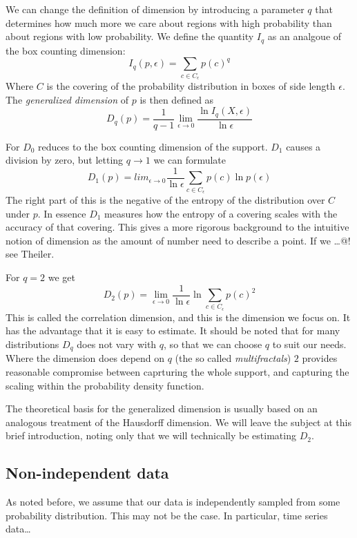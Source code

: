 \documentclass[11pt]{article}
\begin{document}
We can change the definition of dimension by introducing a parameter $q$ that determines how much more we care about regions with high probability than about regions with low probability. We define the quantity $I_q$ as an analgoue of the box counting dimension:
\[
I_q(p, \epsilon) = \sum_{c \in C_\epsilon}p(c)^q 
\]
Where $C$ is the covering of the probability distribution in boxes of side length $\epsilon$. The \textit{generalized dimension} of $p$ is then defined as
\[
D_q(p) = \frac{1}{q-1} \lim_{\epsilon \rightarrow 0} \frac{\ln I_q(X, \epsilon)}{\ln \epsilon}
\]

For $D_0$ reduces to the box counting dimension of the support. $D_1$ causes a division by zero, but letting $q \rightarrow 1$ we can formulate 
\[
D_1(p) = lim_{\epsilon \rightarrow 0} \frac{1}{\ln \epsilon} \sum_{c \in C_\epsilon} p(c) \ln p(\epsilon)
\] 
The right part of this is the negative of the entropy of the distribution over $C$ under $p$. In essence $D_1$ measures how the entropy of a covering scales with the accuracy of that covering. This gives a more rigorous background to the intuitive notion of dimension as the amount of number need to describe a point. If we \ldots @! see Theiler.

For $q = 2$ we get 
\[
D_2(p) = \lim_{\epsilon \rightarrow 0} \frac{1}{\ln \epsilon}\ln \sum_{c \in C_\epsilon} {p(c)^2}
\]
This is called the correlation dimension, and this is the dimension we focus on. It has the advantage that it is easy to estimate. It should be noted that for many distributions $D_q$ does not vary with $q$, so that we can choose $q$ to suit our needs. Where the dimension does depend on $q$ (the so called \textit{multifractals}) $2$ provides reasonable compromise between caprturing the whole support, and capturing the scaling within the probability density function.

The theoretical basis for the generalized dimension is usually based on an analogous treatment of the Hausdorff dimension. We will leave the subject at this brief introduction, noting only that we will technically be estimating $D_2$.

\subsection{Non-independent data}

As noted before, we assume that our data is independently sampled from some probability distribution. This may not be the case. In particular, time series data\ldots
\end{document}
